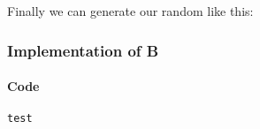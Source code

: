 \noindent
Finally we can generate our random \sqs like this:



\newpage

\subsubsection{Implementation of B}

\paragraph{Code}
\noindent
\begin{centering}


\begin{lstlisting}
test
\end{lstlisting}
\end{centering}
\newpage
